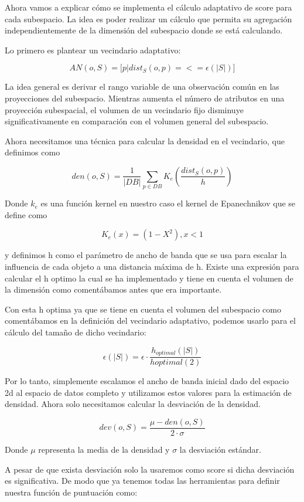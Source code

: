 Ahora vamos a explicar cómo se implementa el cálculo adaptativo de score para cada subespacio.
La idea es poder realizar un cálculo que permita su agregación independientemente de la 
dimensión del subespacio donde se está calculando.

Lo primero es plantear un vecindario adaptativo:

\[ AN(o,S) = \lbrack p | dist_S(o,p)= <= \epsilon(|S|) \rbrack  \]

La idea general es derivar el rango variable de una observación común en 
las proyecciones del subespacio. Mientras aumenta el número de atributos 
en una proyección subespacial, el volumen de un vecindario fijo disminuye 
significativamente en comparación con el volumen general del subespacio.

Ahora necesitamos una técnica para calcular la densidad en el vecindario,
que definimos como 

\[ den(o,S) = \frac{1}{|DB|} \sum_{p \in DB} K_e ( \frac{dist_S(o,p)}{h} ) \]

Donde $k_e$ es una función kernel en nuestro caso el kernel de Epanechnikov
que se define como

\[ K_e(x) = (1-X^2), x < 1\]

y definimos h como el parámetro de ancho de banda que se usa para escalar 
la influencia de cada objeto a una distancia máxima de h. Existe una expresión
para calcular el h optimo la cual se ha implementado y tiene en cuenta el volumen
de la dimensión como comentábamos antes que era importante.

Con esta h optima ya que se tiene en cuenta el volumen del subespacio como comentábamos
en la definición del vecindario adaptativo, podemos usarlo para el cálculo del tamaño
de dicho vecindario:


\[ \epsilon(|S|) = \epsilon \cdot \frac{h_{optimal}(|S|)}{h{optimal}(2)} \]


Por lo tanto, simplemente escalamos el ancho de banda inicial dado del espacio 2d 
al espacio de datos completo y utilizamos estos valores para la estimación de 
densidad. Ahora solo necesitamos calcular la desviación de la densidad.

\[dev(o,S) = \frac{\mu - den(o,S)}{2 \cdot \sigma} \]

Donde $\mu$ representa la media de la densidad y $\sigma$ la desviación estándar.

A pesar de que exista desviación solo la usaremos como score si dicha desviación es
significativa. De modo que ya tenemos todas las herramientas para definir nuestra función
de puntuación como:

